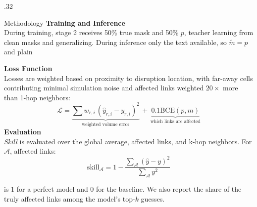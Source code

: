 \documentclass[final]{beamer}
\begin{document}
\begin{frame}[t]
\begin{columns}[t,onlytextwidth]
\begin{column}{.32\textwidth}
\begin{chbox}[stretch]{Methodology}
      \textbf{Training and Inference} \\
      During training, stage 2 receives 50\% true mask and 50\% $p$, teacher learning from clean masks and generalizing. During inference only the text available, so $\tilde m = p$ and plain 
 

      \textbf{Loss Function} \\
      Losses are weighted based on proximity to disruption location, with far-away cells contributing minimal simulation noise and affected links weighted $20\times$ more than 1-hop neighbors:
      \[
      \mathcal{L} = \underbrace{\textstyle\sum w_{r,i}\,(\hat y_{r,i} - y_{r,i})^2}_{\text{weighted volume error}} \, + \, \underbrace{0.1\mathrm{BCE}(p, m)}_{\text{which links are affected}}
      \]
      \textbf{Evaluation} \\
      \textit{Skill} is evaluated over the global average, affected links, and k-hop neighbors. For $\mathcal{A}$, affected links:
      \[
      \mathrm{skill}_{\mathcal{A}} = 1 - \frac{\sum_{\mathcal{A}} (\hat y - y)^2}{\sum_{\mathcal{A}} y^2}
      \]
      
      is 1 for a perfect model and 0 for the baseline. We also report the share of the truly affected links among the model's top-$k$ guesses.

 



\end{chbox}
\end{column}
\end{columns}
\end{frame}
\end{document}
